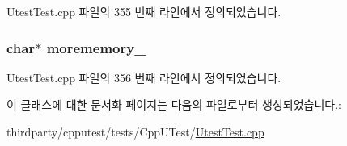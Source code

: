 Utest\+Test.\+cpp 파일의 355 번째 라인에서 정의되었습니다.

\subsubsection[{\texorpdfstring{morememory\+\_\+}{morememory_}}]{\setlength{\rightskip}{0pt plus 5cm}char$\ast$ morememory\+\_\+\hspace{0.3cm}{\ttfamily [private]}}\hypertarget{class_allocate_and_deallocate_in_constructor_and_destructor_a9ba530b9a10f8fae085965ce80d5a649}{}\label{class_allocate_and_deallocate_in_constructor_and_destructor_a9ba530b9a10f8fae085965ce80d5a649}


Utest\+Test.\+cpp 파일의 356 번째 라인에서 정의되었습니다.



이 클래스에 대한 문서화 페이지는 다음의 파일로부터 생성되었습니다.\+:\begin{DoxyCompactItemize}
\item 
thirdparty/cpputest/tests/\+Cpp\+U\+Test/\hyperlink{_utest_test_8cpp}{Utest\+Test.\+cpp}\end{DoxyCompactItemize}
